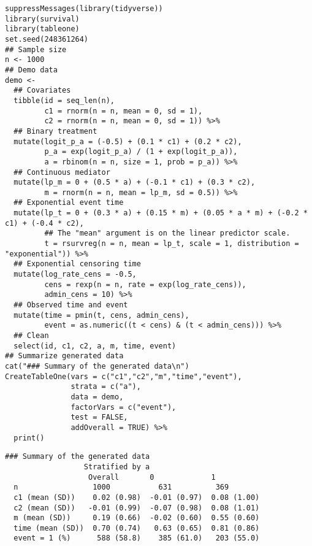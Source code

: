 \documentclass[dvipdfmx,10pt]{article}
\begin{document}
\scriptsize
\begin{verbatim}
suppressMessages(library(tidyverse))
library(survival)
library(tableone)
set.seed(248361264)
## Sample size
n <- 1000
## Demo data
demo <-
  ## Covariates
  tibble(id = seq_len(n),
         c1 = rnorm(n = n, mean = 0, sd = 1),
         c2 = rnorm(n = n, mean = 0, sd = 1)) %>%
  ## Binary treatment
  mutate(logit_p_a = (-0.5) + (0.1 * c1) + (0.2 * c2),
         p_a = exp(logit_p_a) / (1 + exp(logit_p_a)),
         a = rbinom(n = n, size = 1, prob = p_a)) %>%
  ## Continuous mediator
  mutate(lp_m = 0 + (0.5 * a) + (-0.1 * c1) + (0.3 * c2),
         m = rnorm(n = n, mean = lp_m, sd = 0.5)) %>%
  ## Exponential event time
  mutate(lp_t = 0 + (0.3 * a) + (0.15 * m) + (0.05 * a * m) + (-0.2 * c1) + (-0.4 * c2),
         ## The "mean" argument is on the linear predictor scale.
         t = rsurvreg(n = n, mean = lp_t, scale = 1, distribution = "exponential")) %>%
  ## Exponential censoring time
  mutate(log_rate_cens = -0.5,
         cens = rexp(n = n, rate = exp(log_rate_cens)),
         admin_cens = 10) %>%
  ## Observed time and event
  mutate(time = pmin(t, cens, admin_cens),
         event = as.numeric((t < cens) & (t < admin_cens))) %>%
  ## Clean
  select(id, c1, c2, a, m, time, event)
## Summarize generated data
cat("### Summary of the generated data\n")
CreateTableOne(vars = c("c1","c2","m","time","event"),
               strata = c("a"),
               data = demo,
               factorVars = c("event"),
               test = FALSE,
               addOverall = TRUE) %>%
  print()
\end{verbatim}

\begin{verbatim}
### Summary of the generated data
                  Stratified by a
                   Overall       0             1           
  n                 1000           631          369        
  c1 (mean (SD))    0.02 (0.98)  -0.01 (0.97)  0.08 (1.00) 
  c2 (mean (SD))   -0.01 (0.99)  -0.07 (0.98)  0.08 (1.01) 
  m (mean (SD))     0.19 (0.66)  -0.02 (0.60)  0.55 (0.60) 
  time (mean (SD))  0.70 (0.74)   0.63 (0.65)  0.81 (0.86) 
  event = 1 (%)      588 (58.8)    385 (61.0)   203 (55.0)
\end{verbatim}


\normalsize
\end{document}
